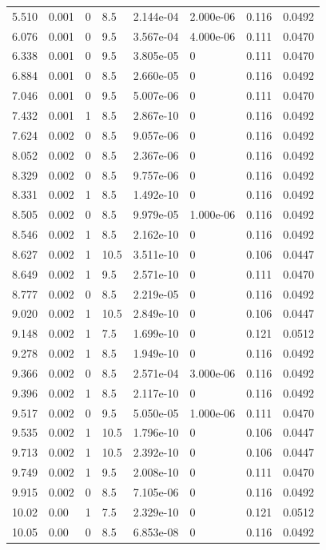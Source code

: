 \documentclass[preview]{standalone}
\begin{document}
{{\begin{tabular}{L{1.2cm}C{1.2cm} C{0.3cm}C{0.5cm} C{1.4cm}C{1.4cm} C{1.4cm}C{1.4cm}}
  5.510  &  0.001  & 0     & 8.5 &  2.144e-04  & 2.000e-06  & 0.116 &  0.0492   \\ 
  6.076  &  0.001  & 0     & 9.5 &  3.567e-04  & 4.000e-06  & 0.111 &  0.0470   \\ 
  6.338  &  0.001  & 0     & 9.5 &  3.805e-05  & 0  & 0.111 &  0.0470   \\ 
  6.884  &  0.001  & 0     & 8.5 &  2.660e-05  & 0  & 0.116 &  0.0492   \\ 
  7.046  &  0.001  & 0     & 9.5 &  5.007e-06  & 0  & 0.111 &  0.0470   \\ 
  7.432  &  0.001  & 1     & 8.5 &  2.867e-10  & 0  & 0.116 &  0.0492   \\ 
  7.624  &  0.002  & 0     & 8.5 &  9.057e-06  & 0  & 0.116 &  0.0492   \\ 
  8.052  &  0.002  & 0     & 8.5 &  2.367e-06  & 0  & 0.116 &  0.0492   \\ 
  8.329  &  0.002  & 0     & 8.5 &  9.757e-06  & 0  & 0.116 &  0.0492   \\ 
  8.331  &  0.002  & 1     & 8.5 &  1.492e-10  & 0  & 0.116 &  0.0492   \\ 
  8.505  &  0.002  & 0     & 8.5 &  9.979e-05  & 1.000e-06  & 0.116 &  0.0492   \\ 
  8.546  &  0.002  & 1     & 8.5 &  2.162e-10  & 0  & 0.116 &  0.0492   \\ 
  8.627  &  0.002  & 1     & 10.5 &  3.511e-10  & 0  & 0.106 &  0.0447   \\ 
  8.649  &  0.002  & 1     & 9.5 &  2.571e-10  & 0  & 0.111 &  0.0470   \\ 
  8.777  &  0.002  & 0     & 8.5 &  2.219e-05  & 0  & 0.116 &  0.0492   \\ 
  9.020  &  0.002  & 1     & 10.5 &  2.849e-10  & 0  & 0.106 &  0.0447   \\ 
  9.148  &  0.002  & 1     & 7.5 &  1.699e-10  & 0  & 0.121 &  0.0512   \\ 
  9.278  &  0.002  & 1     & 8.5 &  1.949e-10  & 0  & 0.116 &  0.0492   \\ 
  9.366  &  0.002  & 0     & 8.5 &  2.571e-04  & 3.000e-06  & 0.116 &  0.0492   \\ 
  9.396  &  0.002  & 1     & 8.5 &  2.117e-10  & 0  & 0.116 &  0.0492   \\ 
  9.517  &  0.002  & 0     & 9.5 &  5.050e-05  & 1.000e-06  & 0.111 &  0.0470   \\ 
  9.535  &  0.002  & 1     & 10.5 &  1.796e-10  & 0  & 0.106 &  0.0447   \\ 
  9.713  &  0.002  & 1     & 10.5 &  2.392e-10  & 0  & 0.106 &  0.0447   \\ 
  9.749  &  0.002  & 1     & 9.5 &  2.008e-10  & 0  & 0.111 &  0.0470   \\ 
  9.915  &  0.002  & 0     & 8.5 &  7.105e-06  & 0  & 0.116 &  0.0492   \\ 
  10.02  &  0.00  & 1     & 7.5 &  2.329e-10  & 0  & 0.121 &  0.0512   \\ 
  10.05  &  0.00  & 0     & 8.5 &  6.853e-08  & 0  & 0.116 &  0.0492   \\ 
\hline 
\end{tabular} 

}}
\end{document}
